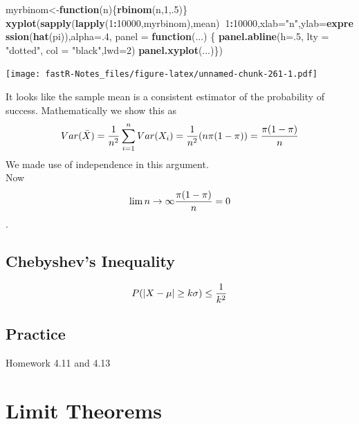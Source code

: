 \documentclass[]{book}
\newenvironment{Shaded}{\begin{snugshade}}{\end{snugshade}}
\newcommand{\KeywordTok}[1]{\textcolor[rgb]{0.13,0.29,0.53}{\textbf{#1}}}
\newcommand{\DataTypeTok}[1]{\textcolor[rgb]{0.13,0.29,0.53}{#1}}
\newcommand{\DecValTok}[1]{\textcolor[rgb]{0.00,0.00,0.81}{#1}}
\newcommand{\StringTok}[1]{\textcolor[rgb]{0.31,0.60,0.02}{#1}}
\newcommand{\ControlFlowTok}[1]{\textcolor[rgb]{0.13,0.29,0.53}{\textbf{#1}}}
\newcommand{\OperatorTok}[1]{\textcolor[rgb]{0.81,0.36,0.00}{\textbf{#1}}}
\newcommand{\NormalTok}[1]{#1}
\theoremstyle{definition}
\theoremstyle{definition}
\theoremstyle{definition}
\theoremstyle{remark}
\begin{document}
\begin{Shaded}
\begin{Highlighting}[]
\NormalTok{myrbinom<-}\ControlFlowTok{function}\NormalTok{(n)\{}\KeywordTok{rbinom}\NormalTok{(n,}\DecValTok{1}\NormalTok{,.}\DecValTok{5}\NormalTok{)\}}
\KeywordTok{xyplot}\NormalTok{(}\KeywordTok{sapply}\NormalTok{(}\KeywordTok{lapply}\NormalTok{(}\DecValTok{1}\OperatorTok{:}\DecValTok{10000}\NormalTok{,myrbinom),mean)}\OperatorTok{~}\DecValTok{1}\OperatorTok{:}\DecValTok{10000}\NormalTok{,}\DataTypeTok{xlab=}\StringTok{"n"}\NormalTok{,}\DataTypeTok{ylab=}\KeywordTok{expression}\NormalTok{(}\KeywordTok{hat}\NormalTok{(pi)),}\DataTypeTok{alpha=}\NormalTok{.}\DecValTok{4}\NormalTok{,}
       \DataTypeTok{panel =} \ControlFlowTok{function}\NormalTok{(...) \{}
         \KeywordTok{panel.abline}\NormalTok{(}\DataTypeTok{h=}\NormalTok{.}\DecValTok{5}\NormalTok{, }\DataTypeTok{lty =} \StringTok{"dotted"}\NormalTok{, }\DataTypeTok{col =} \StringTok{"black"}\NormalTok{,}\DataTypeTok{lwd=}\DecValTok{2}\NormalTok{)}
         \KeywordTok{panel.xyplot}\NormalTok{(...)\})}
\end{Highlighting}
\end{Shaded}

\texttt{[image: fastR-Notes\_files/figure-latex/unnamed-chunk-261-1.pdf]}

It looks like the sample mean is a consistent estimator of the
probability of success. Mathematically we show this as
\[Var(\bar{X})={1 \over n^{2}} \sum_{i=1}^{n}Var(X_{i}) = {1 \over n^{2}}(n\pi(1-\pi))={\pi(1-\pi) \over n}\]
We made use of independence in this argument.\\
Now \[\lim{n \to \infty}{\pi(1-\pi) \over n}=0\].

\subsection{Chebyshev's Inequality}\label{chebyshevs-inequality}

\[P(\vert X- \mu \vert \geq k \sigma) \leq {1 \over k^2}\]

\subsection{Practice}\label{practice-7}

Homework 4.11 and 4.13

\hypertarget{L20}{\section{Limit Theorems}\label{L20}}
\end{document}
